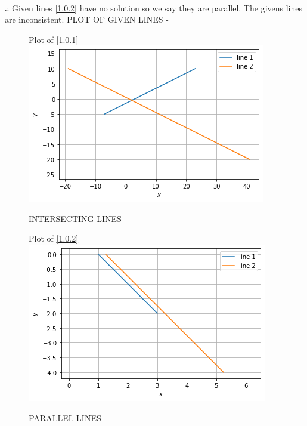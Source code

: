 \documentclass[journal,12pt,twocolumn]{IEEEtran}
\begin{document}
\begin{enumerate}
\begin{align}
\end{align}
$\therefore$ Given lines \eqref{1.0.2} have no solution so we say they are parallel. The givens lines are inconsistent. 
PLOT OF GIVEN LINES -
\begin{figure}[ht!]
Plot of \eqref{1.0.1} -
    \centering
    \includegraphics[width=\columnwidth]{intersecting lines.png}
    \caption{INTERSECTING LINES}
    \label{fig: INTERSECTING LINES.}
\end{figure} 
\begin{figure}[ht]
Plot of \eqref{1.0.2} 
    \centering
   \includegraphics[width=\columnwidth]{parallel lines.png}
    \caption{PARALLEL LINES}
    \label{fig: PARALLEL LINES.}
\end{figure}    
\end{enumerate}
\end{document}
